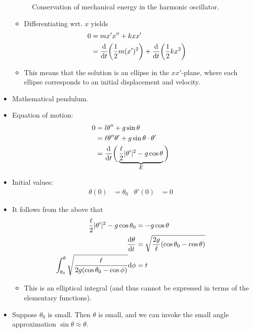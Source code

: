 \documentclass[../notes.tex]{subfiles}
\begin{document}
\begin{itemize}
\begin{figure}[h!]
        \caption{Conservation of mechanical energy in the harmonic oscillator.}
        \label{fig:harmonicEConservation}
    \end{figure}
    \begin{itemize}
        \item Differentiating wrt. $x$ yields
        \begin{align*}
            0 &= mx'x''+kxx'\\
            &= \dv{t}(\frac{1}{2}m(x')^2)+\dv{t}(\frac{1}{2}kx^2)
        \end{align*}
        \item This means that the solution is an ellipse in the $xx'$-plane, where each ellipse corresponds to an initial displacement and velocity.
    \end{itemize}
    \item Mathematical pendulum.
    \item Equation of motion:
    \begin{align*}
        0 &= l\theta''+g\sin\theta\\
        &= \ell\theta''\theta'+g\sin\theta\cdot\theta'\\
        &= \dv{t}\bigg( \underbrace{\frac{\ell}{2}|\theta'|^2-g\cos\theta}_E \bigg)
    \end{align*}
    \item Initial values:
    \begin{align*}
        \theta(0) &= \theta_0&
        \theta'(0) &= 0
    \end{align*}
    \item It follows from the above that
    \begin{align*}
        \frac{\ell}{2}|\theta'|^2-g\cos\theta_0 &= -g\cos\theta\\
        \dv{\theta}{t} &= \sqrt{\frac{2g}{\ell}(\cos\theta_0-\cos\theta)}\\
        \int_{\theta_0}^\theta\sqrt{\frac{\ell}{2g(\cos\theta_0-\cos\phi)}}\dd\phi &= t
    \end{align*}
    \begin{itemize}
        \item This is an elliptical integral (and thus cannot be expressed in terms of the elementary functions).
    \end{itemize}
    \item Suppose $\theta_0$ is small. Then $\theta$ is small, and we can invoke the small angle approximation $\sin\theta\approx\theta$.

\end{itemize}
\end{document}
